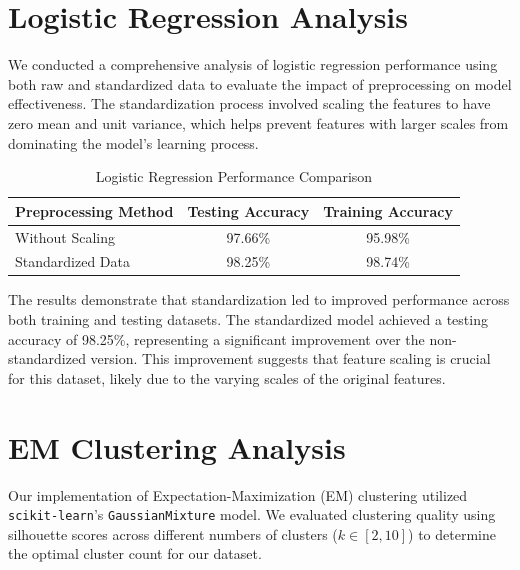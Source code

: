 \documentclass[11pt]{article}
\newcommand{\code}[1]{\texttt{#1}}
\begin{document}
\setcounter{page}{0}
\thispagestyle{empty}
\newpage

\section{Logistic Regression Analysis}

We conducted a comprehensive analysis of logistic regression performance using both raw and standardized data to evaluate the impact of preprocessing on model effectiveness. The standardization process involved scaling the features to have zero mean and unit variance, which helps prevent features with larger scales from dominating the model's learning process.

\begin{table}[H]
\centering
\caption{Logistic Regression Performance Comparison}
\label{tab:log-accuracy}
\begin{tabular}{@{}lcc@{}}
\toprule
Preprocessing Method & Testing Accuracy & Training Accuracy \\ \midrule
Without Scaling & 97.66\% & 95.98\% \\
Standardized Data & 98.25\% & 98.74\% \\
\bottomrule
\end{tabular}
\end{table}

The results demonstrate that standardization led to improved performance across both training and testing datasets. The standardized model achieved a testing accuracy of 98.25\%, representing a significant improvement over the non-standardized version. This improvement suggests that feature scaling is crucial for this dataset, likely due to the varying scales of the original features.

\section{EM Clustering Analysis}

Our implementation of Expectation-Maximization (EM) clustering utilized \code{scikit-learn}'s \code{GaussianMixture} model. We evaluated clustering quality using silhouette scores across different numbers of clusters ($k \in [2,10]$) to determine the optimal cluster count for our dataset.
\end{document}
